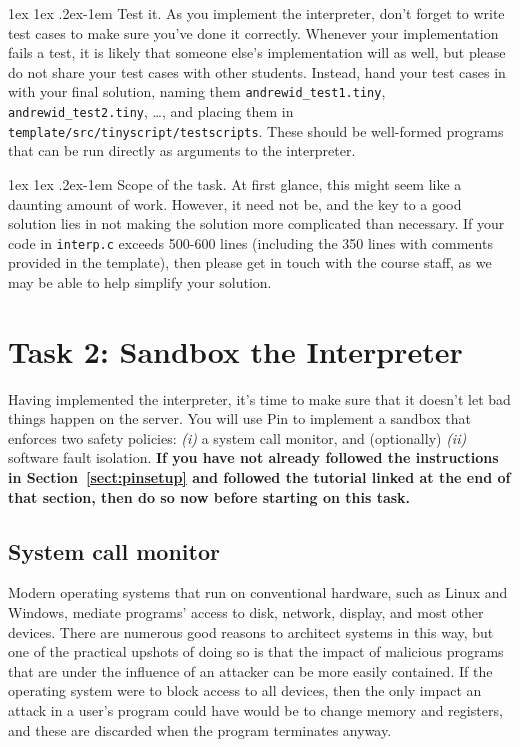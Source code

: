 \documentclass[11pt]{article}
\makeatletter
\renewcommand{\paragraph}{%
  \@startsection{paragraph}{4}%
  {\z@}{1ex \@plus 1ex \@minus .2ex}{-1em}%
  {\normalfont\normalsize\bfseries}
}
\makeatother
\begin{document}
\paragraph{Test it.} As you implement the interpreter, don't forget to write test cases to make sure you've done it correctly. Whenever your implementation fails a test, it is likely that someone else's implementation will as well, but please do not share your test cases with other students. Instead, hand your test cases in with your final solution, naming them \verb'andrewid_test1.tiny', \verb'andrewid_test2.tiny', \ldots, and placing them in \verb'template/src/tinyscript/testscripts'. These should be well-formed programs that can be run directly as arguments to the interpreter.

\paragraph{Scope of the task.} At first glance, this might seem like a daunting amount of work. However, it need not be, and the key to a good solution lies in not making the solution more complicated than necessary. If your code in \verb'interp.c' exceeds 500-600 lines (including the 350 lines with comments provided in the template), then please get in touch with the course staff, as we may be able to help simplify your solution.

\newpage
\section{Task 2: Sandbox the Interpreter}

Having implemented the interpreter, it's time to make sure that it doesn't let bad things happen on the server. You will use Pin to implement a sandbox that enforces two safety policies: \emph{(i)} a system call monitor, and (optionally) \emph{(ii)} software fault isolation. \textbf{If you have not already followed the instructions in Section~\ref{sect:pinsetup} and followed the tutorial linked at the end of that section, then do so now before starting on this task.}

\subsection{System call monitor}
Modern operating systems that run on conventional hardware, such as Linux and Windows, mediate programs' access to disk, network, display, and most other devices. There are numerous good reasons to architect systems in this way, but one of the practical upshots of doing so is that the impact of malicious programs that are under the influence of an attacker can be more easily contained. If the operating system were to block access to all devices, then the only impact an attack in a user's program could have would be to change memory and registers, and these are discarded when the program terminates anyway.
\end{document}
